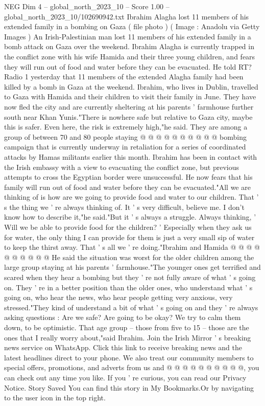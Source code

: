 \begin{textsample}{NEG Dim 4 – global\_north\_2023\_10 – Score 1.00 – global\_north\_2023\_10/102690942.txt}  \label{ex:f4_neg_007}
Ibrahim Alagha lost 11 members of his extended family in a bombing on Gaza ( file photo ) ( Image : Anadolu via Getty Images ) An Irish-Palestinian man lost 11 members of his extended family in a bomb attack on Gaza over the weekend.
Ibrahim Alagha is currently trapped in the conflict zone with his wife Hamida and their three young children, and fears they will run out of food and water before they can be evacuated.
He told RT?
Radio 1 yesterday that 11 members of the extended Alagha family had been killed by a bomb in Gaza at the weekend.
Ibrahim, who lives in Dublin, travelled to Gaza with Hamida and their children to visit their family in June.
They have now fled the city and are currently sheltering at his parents ' farmhouse further south near Khan Yunis."There is nowhere safe but relative to Gaza city, maybe this is safer.
Even here, the risk is extremely high,"he said.
They are among a group of between 70 and 80 people staying @ @ @ @ @ @ @ @ @ @ bombing campaign that is currently underway in retaliation for a series of coordinated attacks by Hamas militants earlier this month.
Ibrahim has been in contact with the Irish embassy with a view to evacuating the conflict zone, but previous attempts to cross the Egyptian border were unsuccessful.
He now fears that his family will run out of food and water before they can be evacuated."All we are thinking of is how are we going to provide food and water to our children.
That ' s the thing we ' re always thinking of.
It ' s very difficult, believe me.
I don't know how to describe it,"he said."But it ' s always a struggle.
Always thinking, ' Will we be able to provide food for the children? ' Especially when they ask us for water, the only thing I can provide for them is just a very small sip of water to keep the thirst away.
That ' s all we ' re doing."Ibrahim and Hamida @ @ @ @ @ @ @ @ @ @ He said the situation was worst for the older children among the large group staying at his parents ' farmhouse."The younger ones get terrified and scared when they hear a bombing but they ' re not fully aware of what ' s going on.
They ' re in a better position than the older ones, who understand what ' s going on, who hear the news, who hear people getting very anxious, very stressed."They kind of understand a bit of what ' s going on and they ' re always asking questions : Are we safe?
Are going to be okay?
We try to calm them down, to be optimistic.
That age group -- those from five to 15 -- those are the ones that I really worry about,"said Ibrahim.
Join the Irish Mirror ' s breaking news service on WhatsApp.
Click this link to receive breaking news and the latest headlines direct to your phone.
We also treat our community members to special offers, promotions, and adverts from us and @ @ @ @ @ @ @ @ @ @, you can check out any time you like.
If you ' re curious, you can read our Privacy Notice.
Story Saved You can find this story in My Bookmarks.Or by navigating to the user icon in the top right.

\end{textsample}
